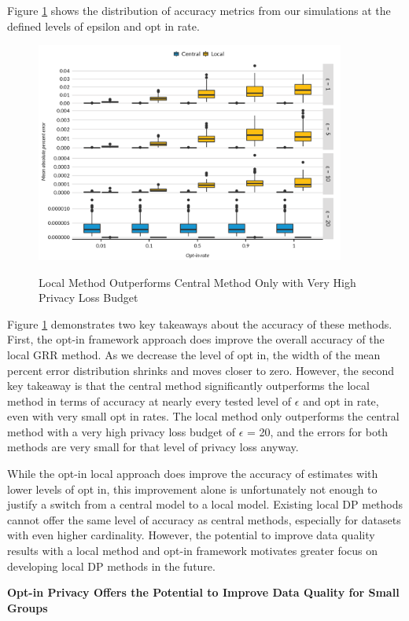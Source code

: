 \documentclass[
]{urban-formatting}
\begin{document}
Figure \ref{fig:methods-accuracy} shows the distribution of accuracy
metrics from our simulations at the defined levels of epsilon and opt in
rate.

\begin{figure}[!htb]
    \centering
    \caption{Local Method Outperforms Central Method Only with Very High Privacy Loss Budget}
    \includegraphics[width=4in]{../figures/methods_accuracy.png}
    \label{fig:methods-accuracy}
\end{figure}

Figure \ref{fig:methods-accuracy} demonstrates two key takeaways about
the accuracy of these methods. First, the opt-in framework approach does
improve the overall accuracy of the local GRR method. As we decrease the
level of opt in, the width of the mean percent error distribution
shrinks and moves closer to zero. However, the second key takeaway is
that the central method significantly outperforms the local method in
terms of accuracy at nearly every tested level of \(\epsilon\) and opt
in rate, even with very small opt in rates. The local method only
outperforms the central method with a very high privacy loss budget of
\(\epsilon\) = 20, and the errors for both methods are very small for
that level of privacy loss anyway.

While the opt-in local approach does improve the accuracy of estimates
with lower levels of opt in, this improvement alone is unfortunately not
enough to justify a switch from a central model to a local model.
Existing local DP methods cannot offer the same level of accuracy as
central methods, especially for datasets with even higher cardinality.
However, the potential to improve data quality results with a local
method and opt-in framework motivates greater focus on developing local
DP methods in the future.

\textbf{Opt-in Privacy Offers the Potential to Improve Data Quality for
Small Groups}
\end{document}
